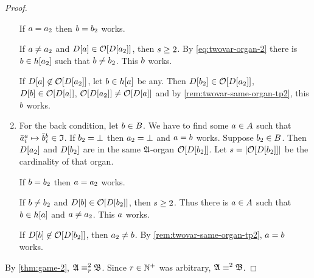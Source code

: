 \begin{proof}
\begin{enumerate}
  If $a = a_{2}$ then $b = b_{2}$ works.
 
  If $a \neq a_{2}$ and $D[a] \in \mathcal{O}[D[a_{2}]]$, then
  $s \geq 2$.
  By \cref{eq:twovar-organ-2} there is $b \in h[a_{2}]$ such that
  $b \neq b_{2}$. This $b$ works.

  If $D[a] \not\in \mathcal{O}[D[a_{2}]]$, let $b \in h[a]$ be any.
  Then $D[b_{2}] \in \mathcal{O}[D[a_{2}]]$, $D[b] \in \mathcal{O}[D[a]]$,
  $\mathcal{O}[D[a_{2}]] \neq \mathcal{O}[D[a]]$ and by
  \cref{rem:twovar-same-organ-tp2}, this $b$ works.
  
  \item For the back condition, let $b \in B$.
  We have to find some $a \in A$ such that
  $\bar{a}_{i}^{a} \mapsto \bar{b}_{i}^{b} \in \mathfrak{I}$.
  If $b_{2} = \bot$ then $a_{2} = \bot$ and $a = b$ works.
  Suppose $b_{2} \in B$. Then $D[a_{2}]$ and $D[b_{2}]$ are in the
  same $\mathfrak{A}$-organ $\mathcal{O}[D[b_{2}]]$.
  Let $s = \left|\mathcal{O}[D[b_{2}]]\right|$ be the cardinality of that organ.
  
  If $b = b_{2}$ then $a = a_{2}$ works.
  
  If $b \neq b_{2}$ and $D[b] \in \mathcal{O}[D[b_{2}]]$, then
  $s \geq 2$.
  Thus there is $a \in A$ such that $b \in h[a]$ and
  $a \neq a_{2}$.
  This $a$ works.
  
  If $D[b] \not\in \mathcal{O}[D[b_{2}]]$, then $a_{2} \neq b$.
  By \cref{rem:twovar-same-organ-tp2}, $a = b$ works.
\end{enumerate}
By \cref{thm:game-2}, $\mathfrak{A} \equiv_{r}^{2} \mathfrak{B}$.
Since $r \in \mathbb{N}^{+}$ was arbitrary, $\mathfrak{A} \equiv^{2} \mathfrak{B}$.
\end{proof}